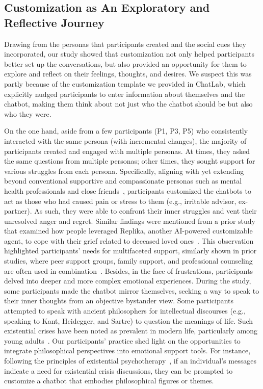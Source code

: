 \subsection{Customization as An Exploratory and Reflective Journey}

Drawing from the personas that participants created and the social cues they incorporated, our study showed that customization not only helped participants better set up the conversations, but also provided an opportunity for them to explore and reflect on their feelings, thoughts, and desires. 
We suspect this was partly because of the customization template we provided in ChatLab, which explicitly nudged participants to enter information about themselves and the chatbot, making them think about not just who the chatbot should be but also who they were.


On the one hand, aside from a few participants (P1, P3, P5) who consistently interacted with the same persona (with incremental changes), the majority of participants created and engaged with multiple personas. At times, they asked the same questions from multiple personas; other times, they sought support for various struggles from each persona. 
Specifically, aligning with yet extending beyond conventional supportive and compassionate personas such as mental health professionals and close friends~\cite{ma2023understanding, chen2023llm}, participants customized the chatbots to act as those who had caused pain or stress to them (e.g., irritable advisor, ex-partner). As such, they were able to confront their inner struggles and vent their unresolved anger and regret. Similar findings were mentioned from a prior study that examined how people leveraged Replika, another AI-powered customizable agent, to cope with their grief related to deceased loved ones~\cite{Xygkou2023Grief}.
This observation highlighted participants' needs for multifaceted support, similarly shown in prior studies, where peer support groups, family support, and professional counseling are often used in combination~\cite{meyers2011community, Galanter2001Network, gui2017peer}.
Besides, in the face of frustrations, participants delved into deeper and more complex emotional experiences. During the study, some participants made the chatbot mirror themselves, seeking a way to speak to their inner thoughts from an objective bystander view. Some participants attempted to speak with ancient philosophers for intellectual discourses (e.g., speaking to Kant, Heidegger, and Sartre) to question the meanings of life. Such existential crises have been noted as prevalent in modern life, particularly among young adults~\cite{wangchuk2021humankind, lundvall2022finding}. 
Our participants' practice shed light on the opportunities to integrate philosophical perspectives into emotional support tools. For instance, following the principles of existential psychotherapy~\cite{yalom2020existential}, if an individual's messages indicate a need for existential crisis discussions, they can be prompted to customize a chatbot that embodies philosophical figures or themes. 


